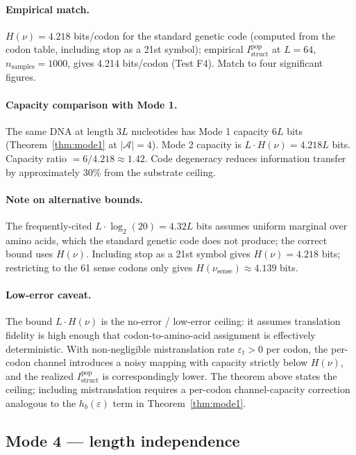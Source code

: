 \documentclass[11pt]{article}
\theoremstyle{plain}
\theoremstyle{definition}
\newcommand{\Istructpop}{I_{\mathrm{struct}}^{\mathrm{pop}}}
\newcommand{\Hbin}{h_b}
\begin{document}
\paragraph{Empirical match.} $H(\nu) = 4.218$ bits/codon for the standard genetic code (computed from the codon table, including stop as a 21st symbol); empirical $\Istructpop$ at $L = 64$, $n_{\mathrm{samples}} = 1000$, gives 4.214 bits/codon (Test F4). Match to four significant figures.

\paragraph{Capacity comparison with Mode 1.} The same DNA at length $3L$ nucleotides has Mode 1 capacity $6L$ bits (Theorem~\ref{thm:mode1} at $|\mathcal{A}| = 4$). Mode 2 capacity is $L \cdot H(\nu) = 4.218L$ bits. Capacity ratio $= 6/4.218 \approx 1.42$. Code degeneracy reduces information transfer by approximately 30\% from the substrate ceiling.

\paragraph{Note on alternative bounds.} The frequently-cited $L \cdot \log_2(20) = 4.32L$ bits assumes uniform marginal over amino acids, which the standard genetic code does not produce; the correct bound uses $H(\nu)$. Including stop as a 21st symbol gives $H(\nu) = 4.218$ bits; restricting to the 61 sense codons only gives $H(\nu_{\mathrm{sense}}) \approx 4.139$ bits.

\paragraph{Low-error caveat.} The bound $L \cdot H(\nu)$ is the no-error / low-error ceiling: it assumes translation fidelity is high enough that codon-to-amino-acid assignment is effectively deterministic. With non-negligible mistranslation rate $\varepsilon_t > 0$ per codon, the per-codon channel introduces a noisy mapping with capacity strictly below $H(\nu)$, and the realized $\Istructpop$ is correspondingly lower. The theorem above states the ceiling; including mistranslation requires a per-codon channel-capacity correction analogous to the $\Hbin(\varepsilon)$ term in Theorem~\ref{thm:mode1}.

\subsection{Mode 4 --- length independence}
\end{document}
